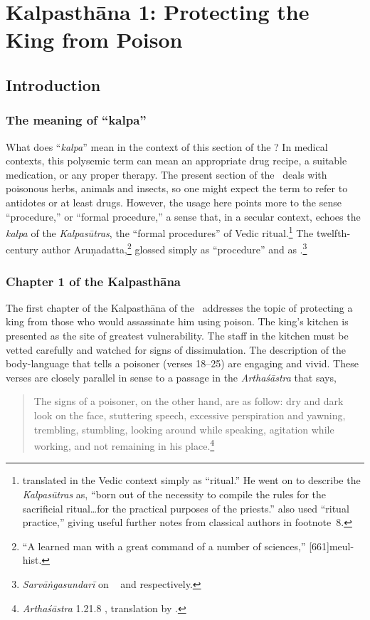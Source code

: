 \chapter{Kalpasthāna 1: Protecting the King from Poison}

\section{Introduction}

\subsection{The meaning of “kalpa”}

What does “\emph{kalpa}” mean in the context of this section of the
\SS? In medical contexts, this polysemic term can mean an appropriate
drug recipe, a suitable medication, or any proper therapy.  The
present section of the \SS\ deals with poisonous herbs, animals and
insects, so one might expect the term to refer to antidotes or at
least drugs. However, the usage here points more to the sense
“procedure,” or “formal procedure,”  a sense that, in a secular context, 
echoes the
\emph{kalpa} of the \emph{Kalpasūtras}, the “formal procedures” of
Vedic ritual.\footnote{\citet[252]{wint-1981} translated 
    in the Vedic context simply as “ritual.”  He went on to describe the
    \emph{Kalpasūtras} as, “born out of the necessity to compile the
rules for
    the sacrificial ritual\ldots for the practical purposes of the
    priests.” \citet[467]{gond-1977} also used “ritual practice,” giving
    useful  further notes from classical authors in footnote~8.}
The twelfth-century author Aruṇadatta,\footnote{“A learned man with a great
command of a number of sciences,” [661]{meul-hist}.}
glossed  simply as  “procedure”  and as
.\footnote{\emph{Sarvāṅgasundarī} on \AH\
     and  
    respectively.}


\subsection{Chapter 1 of the Kalpasthāna}
The first chapter of the Kalpasthāna of the \SS\
addresses the topic of protecting a king from those who would
assassinate him using poison. The king's kitchen is presented as the
site of greatest vulnerability.  The staff in the kitchen must be
vetted carefully and watched for signs of dissimulation.  The
description of the body-language that tells a poisoner (verses 18--25)
are engaging and vivid.  These verses are closely parallel in sense to
a passage in the \emph{Arthaśāstra} that says,
\begin{quote}
    The signs of a poisoner, on the other hand, are as follow: dry and
dark look on the face, stuttering speech, excessive perspiration
and yawning, trembling, stumbling, looking around while speaking,
agitation while working, and not remaining in his
place.\footnote{\emph{Arthaśāstra} 1.21.8 \citep[1,
    30]{kang-1969}, translation by \citet[97]{oliv-2013}.}
\end{quote}

